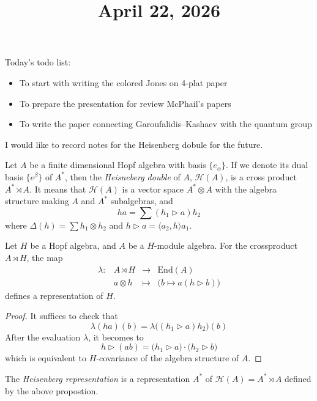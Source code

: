 \documentclass[11pt]{amsart}
\title{April 22, 2026}
\begin{document}
\maketitle

Today's todo list:

\begin{itemize}
    \item To start with writing the colored Jones on 4-plat paper
    \item To prepare the presentation for review McPhail's papers
    \item To write the paper connecting Garoufalidis--Kashaev with the quantum group
\end{itemize}

I would like to record notes for the Heisenberg dobule for the future.

Let $A$ be a finite dimensional Hopf algebra with basis $\{ e_\alpha \}$.
If we denote its dual basis $\{ e^\beta \}$ of $A^*$, then the \emph{Heisneberg double} of $A$, $\mathcal{H}(A)$, is a cross product $A^* \rtimes A$.
It means that $\mathcal{H}(A)$ is a vector space $A^* \otimes A$ with the algebra structure making $A$ and $A^*$ subalgebras, and
\[
    h a = \sum(h_1 \triangleright a) h_2
\]
where $\Delta(h) = \sum h_1 \otimes h_2$ and $h \triangleright a = \langle a_2, h \rangle a_1$.

\begin{proposition}
    Let $H$ be a Hopf algebra, and $A$ be a $H$-module algebra.
    For the crossproduct $A \rtimes H$, the map
    \[
    \begin{array}{lccc}
        \lambda: & A \rtimes H & \longrightarrow & \mathrm{End}(A) \\
        & a \otimes h & \longmapsto & \bigl( b \mapsto a(h \triangleright b) \bigr)
    \end{array}
    \]
    defines a representation of $H$.
\end{proposition}
\begin{proof}
    It suffices to check that
    \[
        \lambda(ha)(b) = \lambda \bigl( (h_1 \triangleright a)h_2 \bigr)(b)
    \]
    After the evaluation $\lambda$, it becomes to
    \[
        h \triangleright (ab) = \bigl( h_1 \triangleright a \bigr) \cdot \bigl( h_2 \triangleright b \bigr)
    \]
    which is equivalent to $H$-covariance of the algebra structure of $A$.
\end{proof}

The \emph{Heisenberg representation} is a representation $A^*$ of $\mathcal{H}(A) = A^* \rtimes A$ defined by the above propostion.
\end{document}
